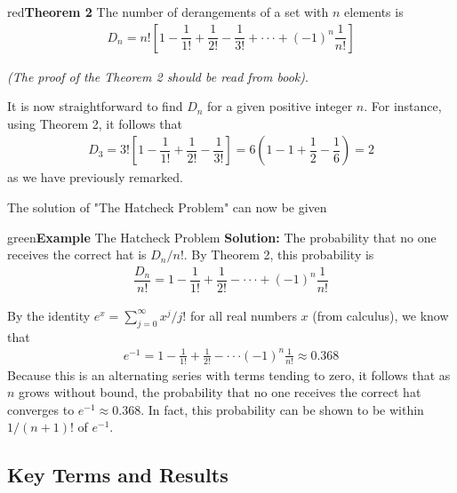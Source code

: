 \documentclass[11pt]{article}
\newenvironment{example}[1][\unskip]{\begin{mybox}{green}{\textbf{Example} {#1}}}{\end{mybox}}
\newenvironment{theorem}[1]{\begin{mybox}{red}{\textbf{Theorem #1}}}{\end{mybox}}
\begin{document}
\begin{theorem}{2}
The number of derangements of a set with $n$ elements is
\begin{align*}
    D_n = n! \left[ 1 - \dfrac{1}{1!} + \dfrac{1}{2!} - \dfrac{1}{3!} + \cdot \cdot \cdot + (-1)^n \dfrac{1}{n!} \right]
\end{align*}
\end{theorem}

\textit{(The proof of the Theorem 2 should be read from book)}.

\newpage
It is now straightforward to find $D_n$ for a given positive integer $n$. For instance, using Theorem 2, it follows that
\begin{align*}
    D_3 = 3! \left[ 1 - \dfrac{1}{1!} + \dfrac{1}{2!} - \dfrac{1}{3!} \right] = 6 \left(1 - 1 + \dfrac{1}{2} - \dfrac{1}{6} \right) = 2
\end{align*}
as we have previously remarked.

The solution of "The Hatcheck Problem" can now be given

\begin{example}[The Hatcheck Problem]
\textbf{Solution:}
The probability that no one receives the correct hat is $D_n / n!$. By Theorem 2, this probability is
\begin{align*}
    \dfrac{D_n}{n!} = 1 - \dfrac{1}{1!} + \dfrac{1}{2!} - \cdot \cdot \cdot + (-1)^n \dfrac{1}{n!}
\end{align*}
\end{example}

By the identity $e^x = \sum_{j=0}^{\infty} x^j / j!$ for all real numbers $x$ (from calculus), we know that
\begin{align*}
    e^{-1} = 1 - \frac{1}{1!} + \frac{1}{2!} - \cdot \cdot \cdot (-1)^n \frac{1}{n!} \approx 0.368
\end{align*}
Because this is an alternating series with terms tending to zero, it follows that as $n$ grows without bound, the probability that no one receives the correct hat converges to $e^{-1} \approx 0.368$. In fact, this probability can be shown to be within $1/(n + 1)!$ of $e^{-1}$.


\newpage
\begin{center}
\section*{Key Terms and Results}
\end{center}
\end{document}
